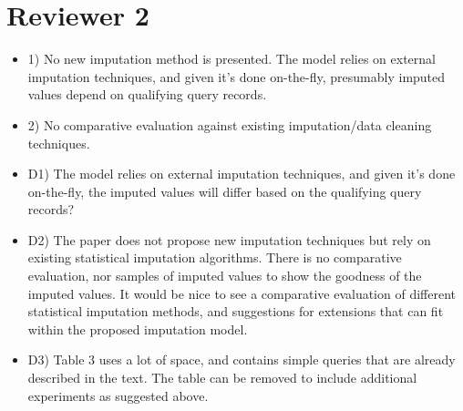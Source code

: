 \documentclass{vldb}
\newcommand{\resp}[1]{{\color{blue}{#1}}}
\begin{document}
\section{Reviewer 2}
\begin{itemize}
\item 1) No new imputation method is presented. The model relies on external imputation techniques, and given it's done on-the-fly, presumably imputed values depend on qualifying query records.

  \resp{Yes, the imputed results depend on the records which are relevant to particular query. We do not present a new imputation method, but our technique is agnostic to the particular imputation method used. We reduce the overhead of imputation by performing it only on the tuples which are relevant to a particular query.}
  
\item 2) No comparative evaluation against existing imputation/data cleaning techniques.

  \resp{Our evaluation compares our technique to an imputation of the full dataset. We use the same imputation algorithm for our on-the-fly imputation as for the full dataset imputation. Cleaning the full dataset is the standard method of handling missing values.}

\item D1) The model relies on external imputation techniques, and given it's done on-the-fly, the imputed values will differ based on the qualifying query records?

  \resp{Yes, as discussed above.}

\item D2) The paper does not propose new imputation techniques but rely on existing statistical imputation algorithms. There is no comparative evaluation, nor samples of imputed values to show the goodness of the imputed values. It would be nice to see a comparative evaluation of different statistical imputation methods, and suggestions for extensions that can fit within the proposed imputation model.

  \resp{The error measures that we provide compare our on-the-fly application of imputation to imputation over the full dataset.}

\item D3) Table 3 uses a lot of space, and contains simple queries that are already described in the text. The table can be removed to include additional experiments as suggested above.
\end{itemize}
\end{document}
